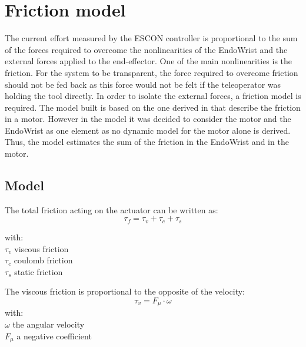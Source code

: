 \section{Friction model}

\label{sec:friction}
The current effort measured by the ESCON controller is proportional to the sum of the forces required to overcome the nonlinearities of the EndoWrist and the external forces applied to the end-effector.
 One of the main nonlinearities is the friction. For the system to be transparent, the force required to overcome friction should not be fed back as this force would not be felt if the teleoperator was holding the tool directly. In order to isolate the external forces, a friction model is required. The model built is based on the one derived in \cite{force_reflection} that describe the friction in a motor. However in the model it was decided to consider the motor and the EndoWrist as one element as no dynamic model for the motor alone is derived. Thus, the model estimates the sum of the friction in the EndoWrist and in the motor.

\subsection{Model}
The total friction acting on the actuator can be written as:
\vspace{9pt}
\begin{equation}
\tau_f = \tau_v + \tau_c + \tau_s
\label{eq:total_friction}
\end{equation} 

with:\\
\hspace*{8mm} $\tau_v$ viscous friction\\
\hspace*{8mm} $\tau_c$ coulomb friction\\
\hspace*{8mm} $\tau_s$ static friction    


The viscous friction is proportional to the opposite of the velocity:
\begin{equation}
\tau_v = F_\mu \cdot \omega
\label{eq:viscous_friction}
\end{equation}
with:\\
\hspace*{8mm}$\omega$ the angular velocity\\
\hspace*{8mm}$F_\mu$ a negative coefficient\\


